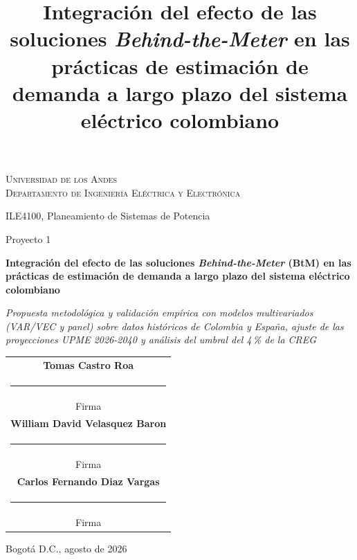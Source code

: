 \documentclass[11pt,letterpaper]{article}
\title{Integración del efecto de las soluciones \emph{Behind-the-Meter} en las
prácticas de estimación de demanda a largo plazo del sistema eléctrico colombiano}
\date{}
\begin{document}
\begin{titlepage}
\centering
{\scshape Universidad de los Andes\\ Departamento de Ingeniería Eléctrica y Electrónica\par}
\vspace{0.6cm}
{ILE4100, Planeamiento de Sistemas de Potencia\par Proyecto 1\par}
\vspace{2.0cm}
{\Large\bfseries Integración del efecto de las soluciones \emph{Behind-the-Meter} (BtM)
en las prácticas de estimación de demanda a largo plazo del sistema eléctrico
colombiano\par}
\vspace{0.7cm}
{\itshape Propuesta metodológica y validación empírica con modelos multivariados
(VAR/VEC y panel) sobre datos históricos de Colombia y España, ajuste de las
proyecciones UPME 2026-2040 y análisis del umbral del 4\,\% de la CREG\par}
\vspace{2.2cm}
\begin{tabular}{c}
\textbf{Tomas Castro Roa}\\[2pt] \rule{6cm}{0.4pt}\\ {\small Firma}\\[15pt]
\textbf{William David Velasquez Baron}\\[2pt] \rule{6cm}{0.4pt}\\ {\small Firma}\\[15pt]
\textbf{Carlos Fernando Diaz Vargas}\\[2pt] \rule{6cm}{0.4pt}\\ {\small Firma}\\
\end{tabular}
\vfill
{Bogotá D.C., agosto de 2026\par}
\end{titlepage}
\end{document}
